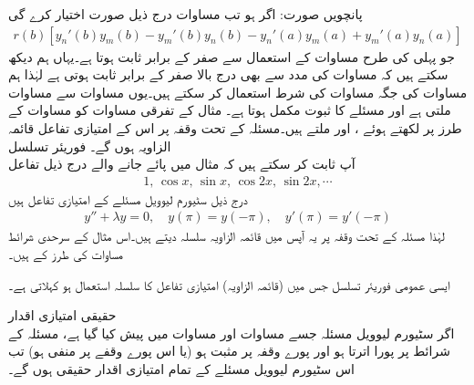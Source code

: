 پانچویں صورت: اگر  ہو تب مساوات   درج ذیل صورت اختیار کرے گی
\begin{align*}
r(b)[y_n'(b)y_m(b)-y_m'(b)y_n(b)-y_n'(a)y_m(a)+y_m'(a)y_n(a)]
\end{align*}
جو پہلی کی طرح  مساوات  کے استعمال سے صفر کے برابر ثابت ہوتا ہے۔یہاں ہم دیکھ سکتے ہیں کہ مساوات  کی مدد سے بھی درج بالا صفر کے برابر ثابت ہوتی ہے لہٰذا ہم مساوات  کی جگہ مساوات  کی شرط استعمال کر سکتے ہیں۔یوں مساوات  سے مساوات  ملتی ہے اور مسئلے کا ثبوت مکمل ہوتا ہے۔
مثال  کے تفرقی مساوات کو مساوات  کے طرز پر لکھتے ہوئے ،  اور  ملتے ہیں۔مسئلہ  کے تحت وقفہ  پر اس کے امتیازی تفاعل قائمہ الزاویہ ہوں گے۔
\quad فوریئر تسلسل\\
آپ ثابت کر سکتے ہیں کہ مثال  میں پائے جانے والے درج ذیل تفاعل 
\begin{align*}
1,\, \cos x , \, \sin x,\, \cos 2x,\, \sin 2x, \cdots
\end{align*}
درج ذیل سٹیورم لیوویل مسئلے کے امتیازی تفاعل ہیں
\begin{align*}
y''+\lambda y=0, \quad y(\pi)=y(-\pi), \quad y'(\pi)=y'(-\pi)
\end{align*}
 لہٰذا مسئلہ  کے تحت وقفہ  پر  یہ آپس میں قائمہ الزاویہ سلسلہ دیتے ہیں۔اس مثال کے سرحدی شرائط مساوات  کی طرز کے ہیں۔

ایسی عمومی فوریئر تسلسل جس میں (قائمہ الزاویہ) امتیازی تفاعل کا سلسلہ استعمال ہو  کہلاتی ہے۔ 

\quad حقیقی امتیازی اقدار\\
اگر سٹیورم لیوویل مسئلہ  جسے مساوات  اور مساوات  میں پیش کیا گیا ہے، مسئلہ  کے شرائط پر پورا اترتا ہو اور پورے وقفہ  پر  مثبت ہو (یا اس پورے وقفے پر   منفی ہو) تب اس سٹیورم لیوویل مسئلے کے تمام امتیازی اقدار حقیقی ہوں گے۔

